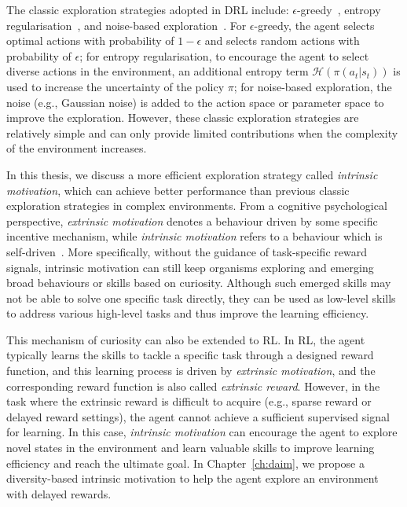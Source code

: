 The classic exploration strategies adopted in DRL include: $\epsilon$-greedy~\cite{mnih2015human,wang2016dueling}, entropy regularisation~\cite{mnih2016asynchronous,schulman2017proximal,schulman2015trust}, and noise-based exploration~\cite{lillicrap2015continuous,plappert2018parameter,fortunato2018noisy}. For $\epsilon$-greedy, the agent selects optimal actions with probability of $1-\epsilon$ and selects random actions with probability of $\epsilon$; for entropy regularisation, to encourage the agent to select diverse actions in the environment, an additional entropy term $\mathcal{H}(\pi(a_{t}|s_{t}))$ is used to increase the uncertainty of the policy $\pi$; for noise-based exploration, the noise (e.g., Gaussian noise) is added to the action space or parameter space to improve the exploration. However, these classic exploration strategies are relatively simple and can only provide limited contributions when the complexity of the environment increases.

In this thesis, we discuss a more efficient exploration strategy called \textit{intrinsic motivation}, which can achieve better performance than previous classic exploration strategies in complex environments. From a cognitive psychological perspective, \textit{extrinsic motivation} denotes a behaviour driven by some specific incentive mechanism, while \textit{intrinsic motivation} refers to a behaviour which is self-driven~\cite{singh2005intrinsically}. More specifically, without the guidance of task-specific reward signals, intrinsic motivation can still keep organisms exploring and emerging broad behaviours or skills based on curiosity. Although such emerged skills may not be able to solve one specific task directly, they can be used as low-level skills to address various high-level tasks and thus improve the learning efficiency. 

This mechanism of curiosity can also be extended to RL. In RL, the agent typically learns the skills to tackle a specific task through a designed reward function, and this learning process is driven by \textit{extrinsic motivation}, and the corresponding reward function is also called \textit{extrinsic reward}. However, in the task where the extrinsic reward is difficult to acquire (e.g., sparse reward or delayed reward settings), the agent cannot achieve a sufficient supervised signal for learning. In this case, \textit{intrinsic motivation} can encourage the agent to explore novel states in the environment and learn valuable skills to improve learning efficiency and reach the ultimate goal. In Chapter~\ref{ch:daim}, we propose a diversity-based intrinsic motivation to help the agent explore an environment with delayed rewards.

